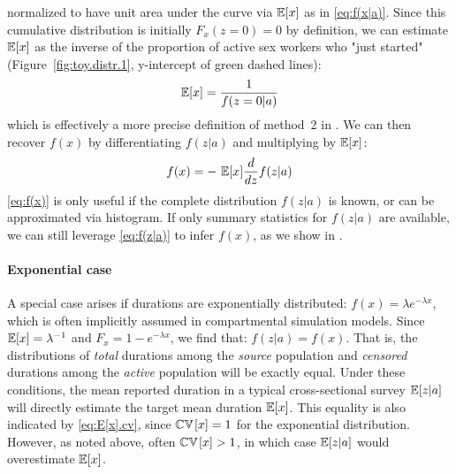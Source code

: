 normalized to have unit area under the curve via $\mathbb{E}[x]$ as in \eqref{eq:f(x|a)}.
Since this cumulative distribution is initially $F_x(z=0) = 0$ by definition,
we can estimate $\mathbb{E}[x]$ as
the inverse of the proportion of active sex workers who "just started"
(Figure~\ref{fig:toy.distr.1}, y-intercept of green dashed lines):
\begin{equation}
  \mathbb{E}[x] = \frac{1}{f(z=0|a)}
  \label{eq:E[x].z0}
\end{equation}
which is effectively a more precise definition of method~2 in \citep{Fazito2012}.
We can then recover $f(x)$ by differentiating $f(z|a)$ and multiplying by $\mathbb{E}[x]$:
\begin{equation}
  f(x) = - ~ \mathbb{E}[x] \frac{d}{dz} f(z|a)
  \label{eq:f(x)}
\end{equation}
\eqref{eq:f(x)} is only useful if the complete distribution $f(z|a)$ is known,
or can be approximated \eg via histogram.
If only summary statistics for $f(z|a)$ are available,
we can still leverage \eqref{eq:f(z|a)} to infer $f(x)$, as we show in .
\paragraph{Exponential case}
A special case arises if durations are exponentially distributed:
$f(x) = \lambda e^{-\lambda x}$,
which is often implicitly assumed in compartmental simulation models.\cite{Garnett2011}
Since $\mathbb{E}[x] = \lambda^{-1}$ and $F_x = 1 - e^{-\lambda x}$,
we find that: $f(z|a) = f(x)$.
That is, the distributions of
\emph{total} durations among the \emph{source} population and
\emph{censored} durations among the \emph{active} population
will be exactly equal.
Under these conditions,
the mean reported duration in a typical cross-sectional survey $\mathbb{E}[z|a]$
will directly estimate the target mean duration $\mathbb{E}[x]$.
This equality is also indicated by \eqref{eq:E[x].cv},
since $\mathbb{CV}\hskip1pt[x] = 1$ for the exponential distribution.
However, as noted above, often $\mathbb{CV}\hskip1pt[x] > 1$,
in which case $\mathbb{E}[z|a]$ would overestimate $\mathbb{E}[x]$.
